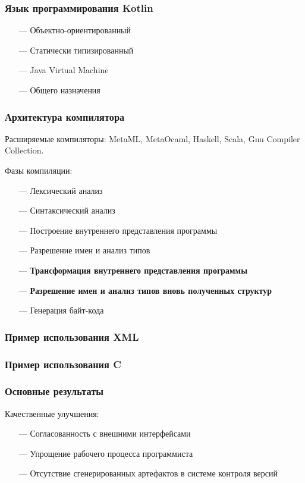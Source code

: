 \documentclass[14pt]{beamer}
\begin{document}
\begin{frame}\frametitle{Язык программирования Kotlin}
    \begin{itemize}
        \item[---] Объектно-ориентированный
        \item[---] Статически типизированный
        \item[---] Java Virtual Machine
        \item[---] Общего назначения
    \end{itemize}
\end{frame}

\begin{frame}\frametitle{Архитектура компилятора}
\linespread{0.9}
\begin{small}
    Расширяемые компиляторы: MetaML, MetaOcaml, Haskell, Scala, Gnu Compiler Collection.

    Фазы компиляции:
    \begin{itemize}
        \item[---] Лексический анализ
        \item[---] Синтаксический анализ
        \item[---] Построение внутреннего представления программы
        \item[---] Разрешение имен и анализ типов
        \item[---] \textbf{Трансформация внутреннего представления программы}
        \item[---] \textbf{Разрешение имен и анализ типов вновь полученных структур}
        \item[---] Генерация байт-кода
    \end{itemize}
\end{small}
\linespread{1.2}
\end{frame}

\begin{frame}\frametitle{Пример использования XML}
\end{frame}

\begin{frame}\frametitle{Пример использования C}
\end{frame}

\begin{frame}\frametitle{Основные результаты}
    Качественные улучшения:
    \begin{itemize}
        \item[---] Согласованность с внешними интерфейсами
        \item[---] Упрощение рабочего процесса программиста
        \item[---] Отсутствие сгенерированных артефактов в системе контроля версий
    \end{itemize}
\end{frame}
\end{document}

